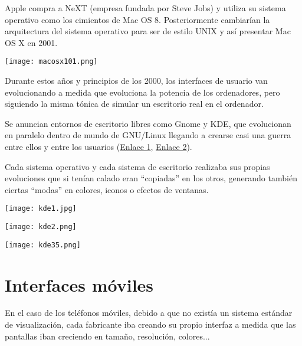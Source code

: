 Apple compra a NeXT (empresa fundada por Steve Jobs) y utiliza su sistema operativo como los cimientos de Mac OS 8. Posteriormente cambiarían la arquitectura del sistema operativo para ser de estilo UNIX y así presentar Mac OS X en 2001.

\vspace{-10pt}
\begin{center}
    \texttt{[image: macosx101.png]}
\end{center}


Durante estos años y principios de los 2000, los interfaces de usuario van evolucionando a medida que evoluciona la potencia de los ordenadores, pero siguiendo la misma tónica de simular un escritorio real en el ordenador.

Se anuncian entornos de escritorio libres como Gnome y KDE, que evolucionan en paralelo dentro de mundo de GNU/Linux llegando a crearse casi una guerra entre ellos y entre los usuarios (\href{https://www.zdnet.com/article/gnome-vs-kde-this-means-war/}{Enlace 1}, \href{https://www.linux.com/news/kde-and-gnome-war/}{Enlace 2}).

Cada sistema operativo y cada sistema de escritorio realizaba sus propias evoluciones que si tenían calado eran “copiadas” en los otros, generando también ciertas “modas” en colores, iconos o efectos de ventanas.

{
    \begin{minipage}{0.32\linewidth}
        \texttt{[image: kde1.jpg]}
    \end{minipage}
    \hfill
    \begin{minipage}{0.32\linewidth}
        \texttt{[image: kde2.png]}
    \end{minipage}
    \hfill
    \begin{minipage}{0.32\linewidth}
        \texttt{[image: kde35.png]}
    \end{minipage}
}


\section{Interfaces móviles}

En el caso de los teléfonos móviles, debido a que no existía un sistema estándar de visualización, cada fabricante iba creando su propio interfaz a medida que las pantallas iban creciendo en tamaño, resolución, colores...

